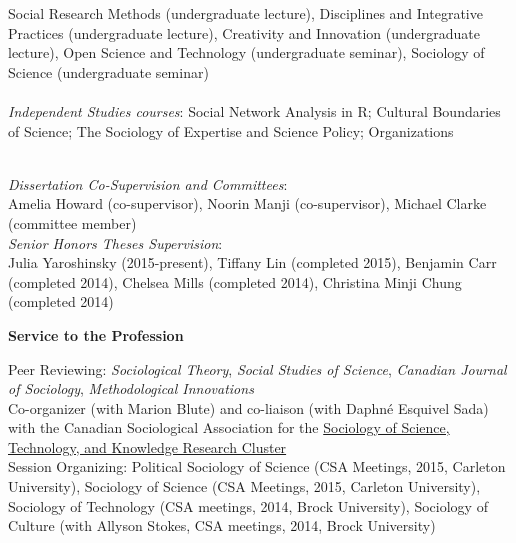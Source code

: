 \documentclass[9pt,usenames,dvipsnames]{article}
\begin{document}
\smallskip
{}

\noindent Social Research Methods (undergraduate lecture), Disciplines and Integrative Practices (undergraduate lecture), Creativity and Innovation (undergraduate lecture), Open Science and Technology (undergraduate seminar), Sociology of Science (undergraduate seminar) \\
\\
\noindent \emph{Independent Studies courses}: Social Network Analysis in R; Cultural Boundaries of Science; The Sociology of Expertise and Science Policy; Organizations \\ %
\\

\smallskip
{}

\noindent \emph{Dissertation Co-Supervision and Committees}:  \\
\noindent Amelia Howard (co-supervisor), Noorin Manji (co-supervisor), Michael Clarke (committee member) \\

\noindent \emph{Senior Honors Theses Supervision}: \\
\noindent Julia Yaroshinsky (2015-present), Tiffany Lin (completed 2015), Benjamin Carr (completed 2014), Chelsea Mills (completed 2014), Christina Minji Chung (completed 2014) \\

\newpage
{}

\ind \textbf{Service to the Profession}

\noindent Peer Reviewing: {\it Sociological Theory}, {\it Social Studies of Science}, {\it Canadian Journal of Sociology}, {\it Methodological Innovations}\\

\noindent Co-organizer (with Marion Blute) and co-liaison (with Daphné Esquivel Sada) with the Canadian Sociological Association for the \href{http://www.csa-scs.ca/files/webapps/csapress/sstk/}{Sociology of Science, Technology, and Knowledge Research Cluster}\\

\noindent Session Organizing: Political Sociology of Science (CSA Meetings, 2015, Carleton University), Sociology of Science (CSA Meetings, 2015, Carleton University), Sociology of Technology (CSA meetings, 2014, Brock University), Sociology of Culture (with Allyson Stokes, CSA meetings, 2014, Brock University) \\
\end{document}
